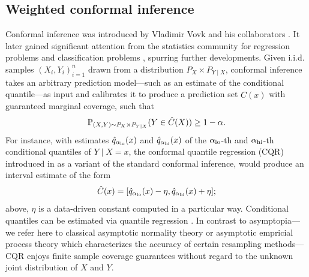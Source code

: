 \subsection{Weighted conformal inference}
Conformal inference was introduced by Vladimir Vovk and his
collaborators \citep[e.g.][]{vovk2005algorithmic,
  gammerman2007hedging, shafer2008tutorial, vovk2009line,
  vovk2012conditional, vovk2013transductive,
  balasubramanian2014conformal, vovk2015cross}. It later gained
significant attention from the statistics community for regression
problems \citep[e.g.][]{lei2013distribution, lei2014distribution,
  lei2018distribution, barber2019limits, barber2019predictive} and
classification problems \citep[e.g.][]{sadinle2019least,
  romano2020classification}, spurring further developments. Given
i.i.d. samples $(X_{i}, Y_{i})_{i=1}^{n}$ drawn from a distribution
$P_{X}\times P_{Y\mid X}$, conformal inference takes an arbitrary
prediction model---such as an estimate of the conditional
quantile---as input and calibrates it to produce a prediction set
$\hat{C}(x)$ with guaranteed marginal coverage, such that 
\begin{equation}
  \label{eq:conformal_guarantee}
  \P_{(X, Y)\sim P_{X}\times P_{Y\mid X}}(Y \in \hat{C}(X))\ge 1 - \alpha.
\end{equation}
For instance, with estimates $\hat{q}_{\alpha_{\lo}}(x)$ and
$\hat{q}_{\alpha_{\hi}}(x)$ of the $\alpha_{\lo}$-th and
$\alpha_{\hi}$-th conditional quantiles of $Y \mid X = x$, the
conformal quantile regression (CQR) introduced in
\cite{romano2019conformalized} as a variant of the standard conformal
inference, would produce an interval estimate of the form
\begin{equation}
  \label{eq:CQR_CX}
  \hat{C}(x) = [\hat{q}_{\alpha_{\lo}}(x) - \eta,
  \hat{q}_{\alpha_{\hi}}(x) + \eta]; 
\end{equation}
above, $\eta$ is a data-driven constant computed in a particular
way. Conditional quantiles can be estimated via quantile regression \citep[e.g.][]{koenker1978regression, koenker1994confidence, koenker2001quantile, yu2001bayesian, koenker2005quantile, meinshausen2006quantile, koenker2017quantile}. In contrast to asymptopia---we refer here to classical
  asymptotic normality theory or asymptotic empricial process theory
  which characterizes the accuracy of certain resampling
  methods---CQR enjoys finite sample coverage guarantees without regard to the
unknown joint distribution of $X$ and $Y$.


